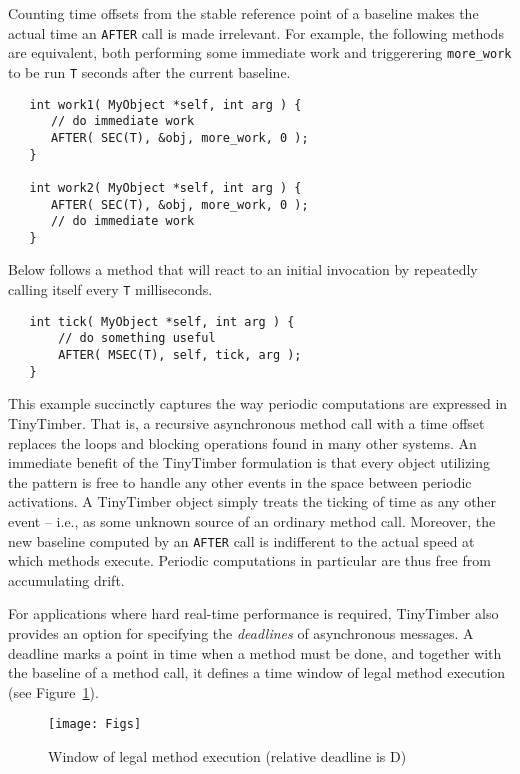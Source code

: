 \documentclass[12pt]{article}
\begin{document}
Counting time offsets from the stable reference point of a baseline makes the actual time an {\tt AFTER} call is made irrelevant.  For example, the following methods are equivalent, both performing some immediate work and triggerering \verb!more_work! to be run {\tt T} seconds after the current baseline.
\begin{verbatim}
   int work1( MyObject *self, int arg ) {
      // do immediate work
      AFTER( SEC(T), &obj, more_work, 0 );
   }
   
   int work2( MyObject *self, int arg ) {
      AFTER( SEC(T), &obj, more_work, 0 );
      // do immediate work
   }
\end{verbatim}

Below follows a method that will react to an initial invocation by repeatedly calling itself every {\tt T} milliseconds.
\begin{verbatim}
   int tick( MyObject *self, int arg ) {
       // do something useful
       AFTER( MSEC(T), self, tick, arg );
   }
\end{verbatim}
This example succinctly captures the way periodic computations are expressed in TinyTimber.  That is, a recursive asynchronous method call with a time offset replaces the loops and blocking operations found in many other systems.  An immediate benefit of the TinyTimber formulation is that every object utilizing the pattern is free to handle any other events in the space between periodic activations.  A TinyTimber object simply treats the ticking of time as any other event -- i.e., as some unknown source of an ordinary method call.  Moreover, the new baseline computed by an {\tt AFTER} call is indifferent to the actual speed at which methods execute.  Periodic computations in particular are thus free from accumulating drift.

For applications where hard real-time performance is required, TinyTimber also provides an option for specifying the {\em deadlines} of asynchronous messages.  A deadline marks a point in time when a method must be done, and together with the baseline of a method call, it defines a time window of legal method execution (see Figure~\ref{fig:deadline}).  

\begin{figure}
\texttt{[image: Figs]}
\caption{\label{fig:deadline}Window of legal method execution (relative deadline is D)}
\end{figure}
\end{document}
